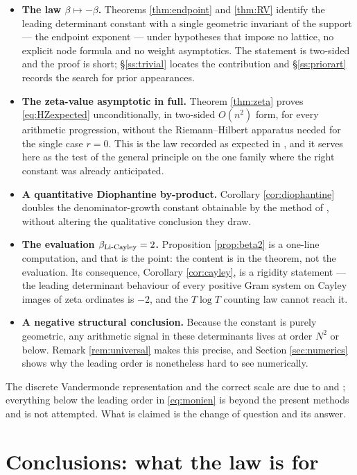 \documentclass[11pt]{amsart}
\numberwithin{equation}{section}
\theoremstyle{plain}
\theoremstyle{definition}
\theoremstyle{remark}
\begin{document}
\begin{itemize}
\item \textbf{The law $\beta\mapsto-\beta$.} Theorems \ref{thm:endpoint} and \ref{thm:RV} identify
the leading determinant constant with a single geometric invariant of the support --- the endpoint
exponent --- under hypotheses that impose no lattice, no explicit node formula and no weight
asymptotics. The statement is two-sided and the proof is short; \S\ref{ss:trivial} locates the
contribution and \S\ref{ss:priorart} records the search for prior appearances.
\item \textbf{The zeta-value asymptotic in full.} Theorem \ref{thm:zeta} proves
\eqref{eq:HZexpected} unconditionally, in two-sided $O(n^{2})$ form, for every arithmetic
progression, without the Riemann--Hilbert apparatus needed for the single case $r=0$. This is the
law recorded as expected in \cite{HaynesZudilin2015}, and it serves here as the test of the general
principle on the one family where the right constant was already anticipated.
\item \textbf{A quantitative Diophantine by-product.} Corollary \ref{cor:diophantine} doubles the
denominator-growth constant obtainable by the method of \cite{HaynesZudilin2015}, without altering
the qualitative conclusion they draw.
\item \textbf{The evaluation $\beta_{\mathrm{Li\text-Cayley}}=2$.} Proposition \ref{prop:beta2} is a
one-line computation, and that is the point: the content is in the theorem, not the evaluation. Its
consequence, Corollary \ref{cor:cayley}, is a rigidity statement --- the leading determinant
behaviour of every positive Gram system on Cayley images of zeta ordinates is $-2$, and the
$T\log T$ counting law cannot reach it.
\item \textbf{A negative structural conclusion.} Because the constant is purely geometric, any
arithmetic signal in these determinants lives at order $N^{2}$ or below. Remark \ref{rem:universal}
makes this precise, and Section \ref{sec:numerics} shows why the leading order is nonetheless hard
to see numerically.
\end{itemize}

The discrete Vandermonde representation and the correct scale are due to \cite{Monien2009} and
\cite{HaynesZudilin2015}; everything below the leading order in \eqref{eq:monien} is beyond the
present methods and is not attempted. What is claimed is the change of question and its answer.

\section{Conclusions: what the law is for}
\label{sec:conclusions}
\end{document}
